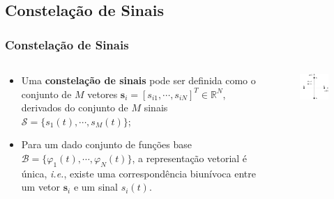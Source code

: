 \documentclass{beamer}
\newcommand{\pag}[1] {\begin{frame}#1\end{frame}}
\begin{document}
\subsection{Constelação de Sinais}
\pag{
	\frametitle{Constelação de Sinais}

	\begin{columns}
		\begin{column}{0.48\textwidth}
			\begin{itemize}
				\item Uma \textbf{constelação de sinais} pode ser definida como o conjunto de $M$ vetores $\mathbf{s}_{i} = [s_{i1}, \cdots, s_{iN}]^{T}\in \mathbb{R}^{N}$, derivados do conjunto de $M$ sinais $\mathcal{S} = \{s_{1}(t),\cdots,s_{M}(t)\}$;
				\item Para um dado conjunto de funções base $\mathcal{B} = \{\varphi_{1}(t),\cdots,\varphi_{N}(t)\}$, a representação vetorial é única, \textit{i.e.}, existe uma correspondência biunívoca entre um vetor $\mathbf{s}_{i}$ e um sinal $s_{i}(t)$.
			\end{itemize}
		\end{column}
		\begin{column}{0.50\textwidth}
			\begin{figure}[!htb]
				\centering
				\includegraphics[width=0.98\linewidth]{Constellation1.pdf}
			\end{figure}
		\end{column}
	\end{columns}	
}
\end{document}
